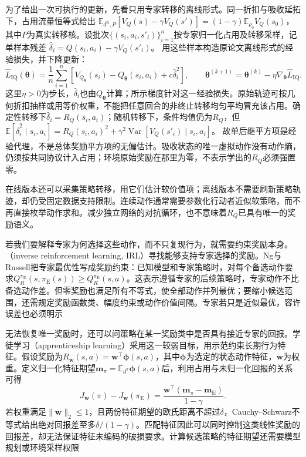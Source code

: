 为了给出一次可执行的更新，先看只用专家转移的离线形式。同一折扣与吸收延拓下，占用流量恒等式给出
$\mathbb E_{d^{\mathrm E},P}[V_Q(s)-\gamma V_Q(s')]
=(1-\gamma)\mathbb E_{\rho_0}V_Q(s_0)$，
其中$P$为真实转移核。设批次$\{(s_i,a_i,s'_i)\}_{i=1}^n$按专家归一化占用及转移采样，记单样本残差
$\widehat\delta_i=Q(s_i,a_i)-\gamma V_Q(s'_i)$。
用这些样本构造原论文离线形式的经验损失，并下降更新：
\[
  \widehat L_{\mathrm{IQ}}(\bm\theta)
  =\frac1n\sum_{i=1}^n
      \left[V_{Q_{\bm\theta}}(s_i)-Q_{\bm\theta}(s_i,a_i)
                    +c\widehat\delta_i^2\right],
  \qquad
  \bm\theta^{(k+1)}
  =\bm\theta^{(k)}-\eta\nabla_{\bm\theta}\widehat L_{\mathrm{IQ}}.
\]
这里$\eta>0$为步长，$\widehat\delta_i$也由$Q_{\bm\theta}$计算；所示梯度针对这一经验损失。原始轨迹可按几何折扣抽样或用等价权重，不能把任意回合的非终止转移均匀平均冒充该占用。确定性转移下$\widehat\delta_i=R_Q(s_i,a_i)$；随机转移下，条件均值仍为$R_Q$，但
$\mathbb E[\widehat\delta_i^2\mid s_i,a_i]
=R_Q(s_i,a_i)^2+\gamma^2\operatorname{Var}[V_Q(s'_i)\mid s_i,a_i]$。
故单后继平方项是经验代理，不是总体奖励平方项的无偏估计。吸收状态的唯一虚拟动作没有动作熵，仍须按共同协议计入占用；环境原始奖励在那里为零，不表示学出的$R_Q$必须强置零。

在线版本还可以采集策略转移，用它们估计软价值项；离线版本不需要刷新策略轨迹，却仍受固定数据支持限制。连续动作通常需要参数化行动者近似软策略，而不再直接枚举动作求和。减少独立网络的对抗循环，也不意味着$R_Q$已具有唯一的奖励语义。

若我们要解释专家为何选择这些动作，而不只复现行为，就需要约束奖励本身。（inverse reinforcement learning, IRL）寻找能够支持专家选择的奖励。Ng与Russell把专家最优性写成奖励约束：已知模型和专家策略时，对每个备选动作要求$Q_R^{\pi_{\mathrm E}}(s,\pi_{\mathrm E}(s))\geq Q_R^{\pi_{\mathrm E}}(s,a)$。这表示遵循专家的后续策略时，专家动作不比备选动作差。但零奖励也满足所有不等式，使全部动作并列最优；要缩小候选范围，还需规定奖励函数类、幅度约束或动作价值间隔。专家若只是近似最优，容许误差也必须明示

无法恢复唯一奖励时，还可以问策略在某一奖励类中是否具有接近专家的回报。学徒学习（apprenticeship learning）采用这一较弱目标，用示范约束长期行为特征。假设奖励为$R_{\bm w}(s,a)=\bm w^\top\bm\phi(s,a)$，其中$\bm\phi$为选定的状态动作特征，$\bm w$为权重。定义归一化特征期望$\bm m_\pi=\mathbb E_{d^\pi}\bm\phi(s,a)$后，利用占用与未归一化回报的关系可得
\begin{equation}
  J_{\bm w}(\pi)-J_{\bm w}(\pi_{\mathrm E})
  =\frac{\bm w^\top(\bm m_\pi-\bm m_{\mathrm E})}{1-\gamma}.
  \label{eq:rl-reward-feature}
\end{equation}
若权重满足$\lVert\bm w\rVert_2\leq1$，且两份特征期望的欧氏距离不超过$\delta$，Cauchy--Schwarz不等式给出绝对回报差至多$\delta/(1-\gamma)$。匹配特征因此可以同时控制这类线性奖励的回报差，却无法保证特征未编码的破损要求。计算候选策略的特征期望还需要模型规划或环境采样权限


